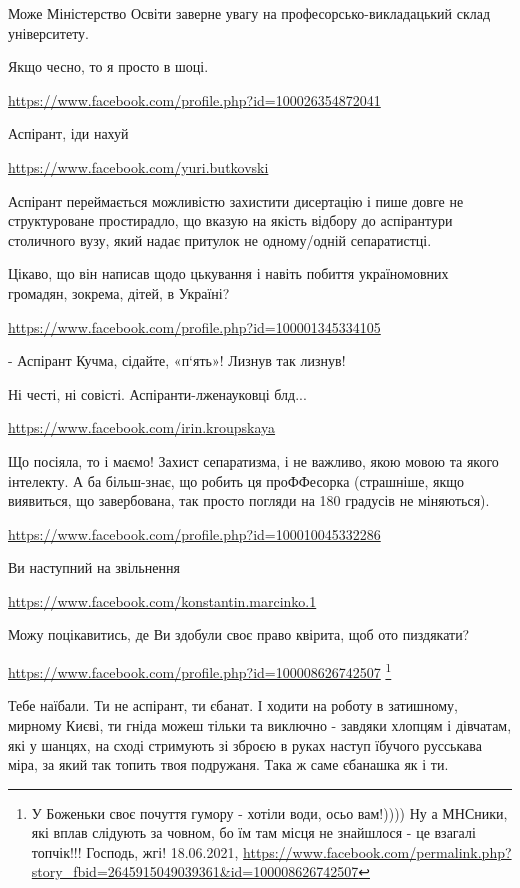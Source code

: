 \begin{itemize}
Може Міністерство Освіти заверне увагу на професорсько-викладацький склад
університету.

Якщо чесно, то я просто в шоці.

\url{https://www.facebook.com/profile.php?id=100026354872041}

Аспірант, іди нахуй

\url{https://www.facebook.com/yuri.butkovski}

Аспірант переймається можливістю захистити дисертацію і пише довге не
структуроване простирадло, що вказую на якість відбору до аспірантури
столичного вузу, який надає притулок не одному/одній сепаратистці.

Цікаво, що він написав щодо цькування і навіть побиття україномовних громадян,
зокрема, дітей, в Україні?

\url{https://www.facebook.com/profile.php?id=100001345334105}

- Аспірант Кучма, сідайте, «п‘ять»!
Лизнув так лизнув!

Ні честі, ні совісті. Аспіранти-лженауковці блд...

\url{https://www.facebook.com/irin.kroupskaya}

Що посіяла, то і маємо! Захист сепаратизма, і не важливо, якою мовою та якого
інтелекту. А ба більш-знає, що робить ця проФФесорка (страшніше, якщо
виявиться, що завербована, так просто погляди на 180 градусів не міняються).

\url{https://www.facebook.com/profile.php?id=100010045332286}

Ви наступний на звільнення

\url{https://www.facebook.com/konstantin.marcinko.1}

Можу поцікавитись, де Ви здобули своє право квірита, щоб ото пиздякати?

\url{https://www.facebook.com/profile.php?id=100008626742507}
\footnote{У Боженьки своє почуття гумору - хотіли води, осьо вам!)))) Ну а
МНСники, які вплав слідують за човном, бо їм там місця не знайшлося - це взагалі
топчік!!! Господь, жгі! 18.06.2021, \url{https://www.facebook.com/permalink.php?story_fbid=2645915049039361&id=100008626742507}}

Тебе наїбали. Ти не аспірант, ти єбанат. І ходити на роботу в затишному,
мирному Києві, ти гніда можеш тільки та виключно - завдяки хлопцям і дівчатам,
які у шанцях, на сході стримують зі зброєю в руках наступ їбучого русськава
міра, за який так топить твоя подружаня. Така ж саме єбанашка як і ти.


\end{itemize}
